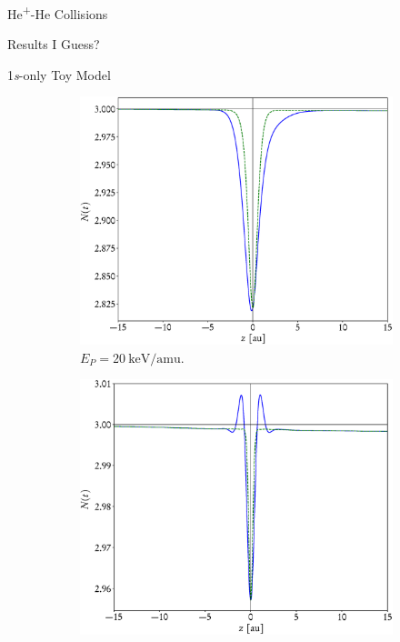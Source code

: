 \documentclass[letterpaper, 11 pt]{report}
\begin{document}
\begin{chapter}{\texorpdfstring{He\textsuperscript{+}}{He+}-He Collisions \label{chap:hephe}}
\begin{section}{Results I Guess? \label{sec:hephe-disc}}
\begin{subsection}{1\textit{s}-only Toy Model \label{sec:toy}}
         \begin{figure}[t]
            \centering
            \begin{subfigure}{.5\textwidth}
               \centering
               \includegraphics[width=\linewidth]{./images/toymodel/dNorm-1s-20.eps}
               \caption{$E_P = 20~\mathrm{keV}/\mathrm{amu}$. \label{fig:toy20}}
            \end{subfigure}%
            \begin{subfigure}{.5\textwidth}
               \centering
               \includegraphics[width=\linewidth]{./images/toymodel/dNorm-1s-1000.eps}

\end{subfigure}
\end{figure}
\end{subsection}
\end{section}
\end{chapter}
\end{document}
